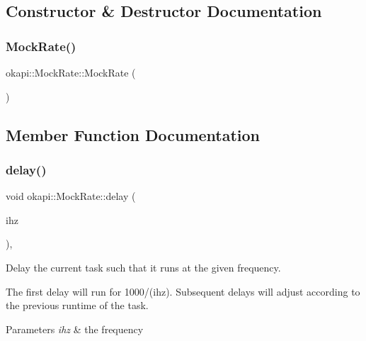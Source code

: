 \subsection{Constructor \& Destructor Documentation}
\mbox{\label{classokapi_1_1MockRate_a2525b2b5f77a2c03b0eb52349e593e85}} 
\subsubsection{\texorpdfstring{MockRate()}{MockRate()}}
{\footnotesize\ttfamily okapi\+::\+Mock\+Rate\+::\+Mock\+Rate (\begin{DoxyParamCaption}{ }\end{DoxyParamCaption})}



\subsection{Member Function Documentation}
\mbox{\label{classokapi_1_1MockRate_a250509f0ad94f97f57581396b0053ef5}} 
\subsubsection{\texorpdfstring{delay()}{delay()}\hspace{0.1cm}{\footnotesize\ttfamily [1/2]}}
{\footnotesize\ttfamily void okapi\+::\+Mock\+Rate\+::delay (\begin{DoxyParamCaption}\item[{Q\+Frequency}]{ihz }\end{DoxyParamCaption})\hspace{0.3cm}{\ttfamily [override]}, {\ttfamily [virtual]}}



Delay the current task such that it runs at the given frequency. 

The first delay will run for 1000/(ihz). Subsequent delays will adjust according to the previous runtime of the task.


\begin{DoxyParams}{Parameters}
{\em ihz} & the frequency \\
\hline
\end{DoxyParams}



